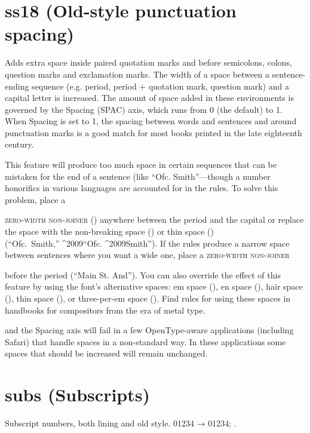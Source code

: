 \documentclass[12pt,letterpaper,openany]{book}
\begin{document}
\section{ss18 (Old-style punctuation spacing)}
{\spaced{} Adds extra space inside paired quotation marks and before semicolons, colons, question
marks and exclamation marks. The width of a space between a sentence-ending sequence
(e.g. period, period + quotation mark, question mark) and a capital letter is increased.
The amount of space added in these environments is governed by the Spacing (SPAC) axis,
which runs from 0 (the default) to 1. When Spacing is set to 1, the spacing between
words and sentences and around punctuation marks is a good match for most books
printed in the late eighteenth century.

This feature will produce too much space in certain sequences that can be mistaken
for the end of a sentence (like “Ofc. Smith”—though a number
honorifics in various languages are accounted for in the rules. To solve this problem, place a}
\textsc{zero-width non-joiner }{\spaced{}() anywhere between the period and the capital
or replace the space with the non-breaking space () or thin space () (“Ofc.^^a0Smith,”^^^^2009“Ofc.^^^^2009Smith”). If
the rules produce a narrow space between sentences where you want a wide one,
place a }\textsc{zero-width non-joiner} {\spaced{}before the period (“Main St\/. And”).
You can also override the effect of this feature by using the font’s alternative
spaces: em space (), en space (), hair space (), thin space (),
or three-per-em space (). Find rules for using these spaces in
handbooks for compositors from the era of metal type.

 and the Spacing axis will fail in a few OpenType-aware applications (including Safari) that
handle spaces in a non-standard way. In these applications some spaces that should be increased
will remain unchanged.}


\section{subs (Subscripts)}
Subscript numbers, both lining and old style. 01234 →
{ 01234};
.
\end{document}
